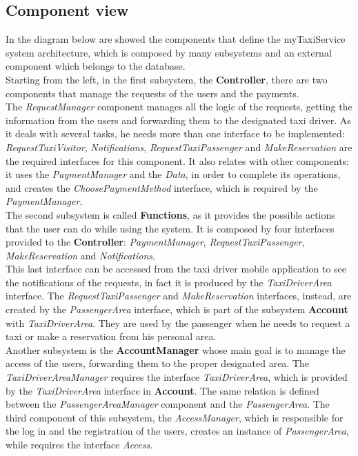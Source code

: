 	\newpage
		\subsection{Component view}
		In the diagram below are showed the components that define the myTaxiService system architecture, which is composed by many subsystems and an external component which belongs to the database.\\ Starting from the left, in the first subsystem, the \textbf{Controller}, there are two components that manage the requests of the users and the payments.\\ The \textit{RequestManager} component manages all the logic of the requests, getting the information from the users and forwarding them to the designated taxi driver. As it deals with several tasks, he needs more than one interface to be implemented: \textit{RequestTaxiVisitor}, \textit{Notifications}, \textit{RequestTaxiPassenger} and \textit{MakeReservation} are the required interfaces for this component. It also relates with other components: it uses the \textit{PaymentManager} and the \textit{Data}, in order to complete its operations, and creates the \textit{ChoosePaymentMethod} interface, which is required by the \textit{PaymentManager}.\\
		The second subsystem is called \textbf{Functions}, as it provides the possible actions that the user can do while using the system. It is composed by four interfaces provided to the \textbf{Controller}: \textit{PaymentManager}, \textit{RequestTaxiPassenger}, \textit{MakeReservation} and \textit{Notifications}.\\
		This last interface can be accessed from the taxi driver mobile application to see the notifications of the requests, in fact it is produced by the \textit{TaxiDriverArea} interface.
		The \textit{RequestTaxiPassenger} and \textit{MakeReservation} interfaces, instead, are created by the \textit{PassengerArea} interface, which is part of the subsystem \textbf{Account} with \textit{TaxiDriverArea}. They are used by the passenger when he needs to request a taxi or make a reservation from his personal area.\\
		Another subsystem is the \textbf{AccountManager} whose main goal is to manage the access of the users, forwarding them to the proper designated area. The \textit{TaxiDriverAreaManager} requires the interface \textit{TaxiDriverArea}, which is provided by the \textit{TaxiDriverArea} interface in \textbf{Account}. The same relation is defined between the \textit{PassengerAreaManager} component and the \textit{PassengerArea}. The third component of this subsystem, the \textit{AccessManager}, which is responsible for the log in and the registration of the users, creates an instance of \textit{PassengerArea}, while requires the interface \textit{Access}.\\
